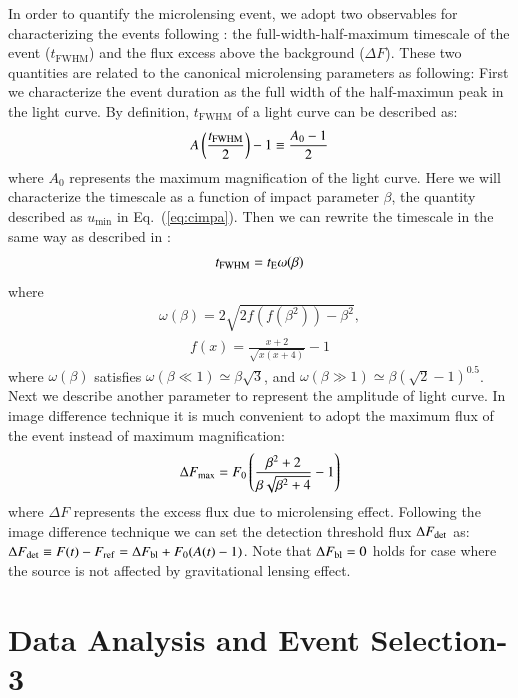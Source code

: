 \documentclass[iop, apj]{emulateapj}
\newcommand{\?}{\stackrel{?}{=}}
\begin{document}
In order to quantify the microlensing event, we adopt two observables for characterizing the events following \citet{Riffeseretal:06}: the full-width-half-maximum timescale of the event ($t_\mathrm{FWHM}$) and the flux excess above the background ($\Delta F$). These two quantities are related to the canonical microlensing parameters as following: 
%
First we characterize the event duration as the full width of the half-maximun peak in the light curve. 
By definition, $t_\mathrm{FWHM}$ of a light curve can be described as: 
%
\begin{eqnarray}
A\left(\frac{t_{\rm FWHM}}{2}\right)-1\equiv\frac{A_0-1}{2}
\end{eqnarray}
%
where $A_0$ represents the maximum magnification of the light curve. Here we will characterize the timescale as a function of impact parameter $\beta$, the quantity described as $u_\mathrm{min}$ in Eq.~(\ref{eq:cimpa}). Then we can rewrite the timescale in the same way as described in \citet{Gondolo:99}: 
%
\begin{eqnarray}
t_{\rm FWHM}=t_{\rm E}\omega(\beta)
\end{eqnarray}
%
where 
%
\begin{eqnarray}
\omega(\beta)=2\sqrt{2f(f(\beta^2))-\beta^2},
\end{eqnarray}
%
\begin{eqnarray}
f(x)=\frac{x+2}{\sqrt{x(x+4)}}-1
\end{eqnarray}
%
where $\omega(\beta)$ satisfies $\omega(\beta\ll1)\simeq \beta\sqrt{3}$, and $\omega(\beta\gg1)\simeq\beta(\sqrt{2}-1)^{0.5}$. 
Next we describe another parameter to represent the amplitude of light curve. In image difference technique it is much convenient to adopt the maximum flux of the event instead of maximum magnification: 
%
\begin{eqnarray}
\Delta F_{\rm max}=F_0\left(\frac{\beta^2+2}{\beta\sqrt{\beta^2+4}}-1\right)
\end{eqnarray}
%
where $\Delta F$ represents the excess flux due to microlensing effect. Following the image difference technique we can set the detection threshold flux $\Delta F_{\rm det}$ as: 
$\Delta F_{\rm det}\equiv F(t)-F_{\rm ref}=\Delta F_{\rm bl}+F_0(A(t)-1)$. 
Note that $\Delta F_{\rm bl}=0$ holds for case where the source is not affected by gravitational lensing effect. 




\section{Data Analysis and Event Selection-3}
\label{sec:obs2}
\end{document}
